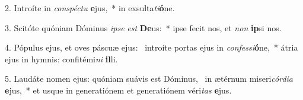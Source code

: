 2. Introíte in \textit{con}\textit{spéc}\textit{tu} \textbf{e}jus,~*  in exsulta\textit{ti}\textbf{ó}ne.\

3. Scitóte quóniam Dóminus \textit{ip}\textit{se} \textit{est} \textbf{De}us:~*  ipse fecit nos, et \textit{non} \textbf{ip}si nos.\

4. Pópulus ejus, et oves páscuæ ejus: \dag\  introíte portas ejus in \textit{con}\textit{fes}\textit{si}\textbf{ó}ne,~*  átria ejus in hymnis: confitémi\textit{ni} \textbf{il}li.\

5. Laudáte nomen ejus: quóniam suávis est Dóminus, \dag\  in ætérnum miseri\textit{cór}\textit{di}\textit{a} \textbf{e}jus,~*  et usque in generatiónem et generatiónem véri\textit{tas} \textbf{e}jus.\


